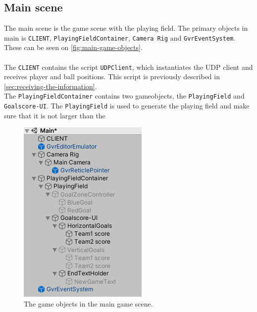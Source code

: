 \subsection{Main scene}
The main scene is the game scene with the playing field.
The primary objects in main is \texttt{CLIENT}, \texttt{PlayingFieldContainer}, \texttt{Camera Rig} and \texttt{GvrEventSystem}.
These can be seen on \autoref{fig:main-game-objects}.
\\\\
The \texttt{CLIENT} contains the script \texttt{UDPClient}, which instantiates the UDP client and receives player and ball positions.
This script is previously described in \autoref{sec:receiving-the-information}.
\\
The \texttt{PlayingFieldContainer} contains two gameobjects, the \texttt{PlayingField} and \texttt{Goalscore-UI}.
The \texttt{PlayingField} is used to generate the playing field and make sure that it is not larger than the
\begin{figure}[H]
    \centering
    \includegraphics[width=0.4\linewidth]{figures/unity-main-gameobjects.PNG}
    \caption{The game objects in the main game scene.}
    \label{fig:main-game-objects}
\end{figure}

